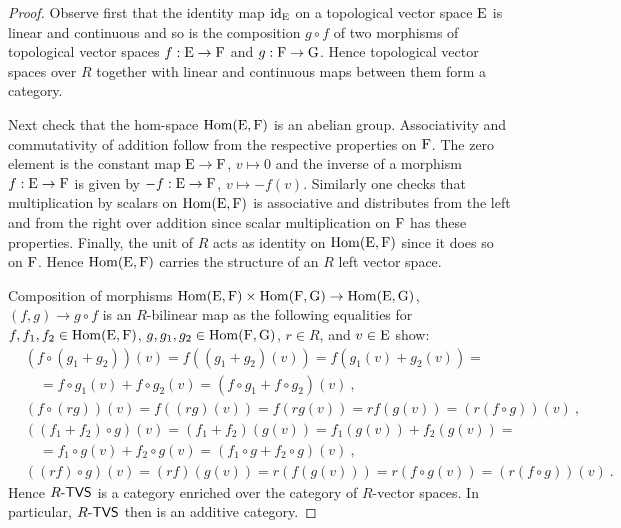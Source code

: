 \begin{proof}
  Observe first that the identity map $\mathrm{id}_{\mathrm{E}}$ on a topological vector space $\mathrm{E}$
  is linear and continuous and so is the composition $g\circ f$ of two
  morphisms of topological vector spaces $f:\mathrm{E} \to\mathrm{F}$ and
  $g:\mathrm{F} \to\mathrm{G}$. Hence topological vector spaces over $R$ together with linear
  and continuous maps between them form a category.

  Next check that the hom-space $\operatorname{Hom}\nolimits (\mathrm{E},\mathrm{F})$ is an abelian group.
  Associativity and commutativity of addition
  follow from the respective properties on $\mathrm{F}$. The zero element is the constant map
  $\mathrm{E} \to\mathrm{F}$, $v \mapsto 0$ and the inverse of a morphism $f:\mathrm{E} \to\mathrm{F}$
  is given by $-f:\mathrm{E} \to\mathrm{F}$,  $v \mapsto -f(v)$.
  Similarly one checks that multiplication by scalars on $\operatorname{Hom}\nolimits (\mathrm{E},\mathrm{F})$ is associative
  and distributes from the left and from the right over addition since scalar multiplication on
  $\mathrm{F}$ has these properties. Finally, the unit of $R$ acts as identity on
  $\operatorname{Hom}\nolimits (\mathrm{E},\mathrm{F})$ since it does so  on  $\mathrm{F}$. Hence $\operatorname{Hom}\nolimits (\mathrm{E},\mathrm{F})$
  carries the structure of an $R$ left vector space.

  Composition of morphisms
  $\operatorname{Hom}\nolimits (\mathrm{E},\mathrm{F}) \times \operatorname{Hom}\nolimits (\mathrm{F},\mathrm{G}) \to \operatorname{Hom}\nolimits (\mathrm{E},\mathrm{G})$,
  $(f,g)\to g \circ f $ is an $R$-bilinear map as the following equalities for 
  $f,f_1,f_2\in \operatorname{Hom}\nolimits (\mathrm{E},\mathrm{F})$, $g,g_1,g_2 \in \operatorname{Hom}\nolimits (\mathrm{F},\mathrm{G})$,
  $r\in R$, and $v\in \mathrm{E}$ show:
  \begin{align}
    \nonumber
    &(f \circ (g_1+g_2)) (v) = f( (g_1+g_2) (v) ) = f( g_1(v) +g_2(v) ) = \\ \nonumber
    & \quad = f\circ g_1(v) + f\circ g_2(v) =  (f\circ g_1+ f\circ g_2) (v)\ , \\ \nonumber
    &(f \circ (r g)) (v) = f( (rg) (v) ) = f(r g(v))  = r f( g(v)) =  (r(f\circ g)) (v)\ ,  \\ \nonumber
    &((f_1+f_2) \circ g) (v) = (f_1+f_2) ( g (v)) = f_1(g(v)) + f_2 (g(v)) = \\ \nonumber
    & \quad = f_1\circ g(v) + f_2\circ g(v) =  (f_1\circ g+ f_2\circ g) (v)\ , \\ \nonumber
    &((rf) \circ g) (v) = (rf)( g (v)) = r (f(g(v)))  = r (f \circ g (v)) =  (r(f\circ g)) (v) \ .
  \end{align}
  Hence $R\text{-}\mathsf{TVS}$ is a category enriched over the category of $R$-vector spaces.
  In particular,  $R\text{-}\mathsf{TVS}$ then is an additive category. 
\end{proof}

